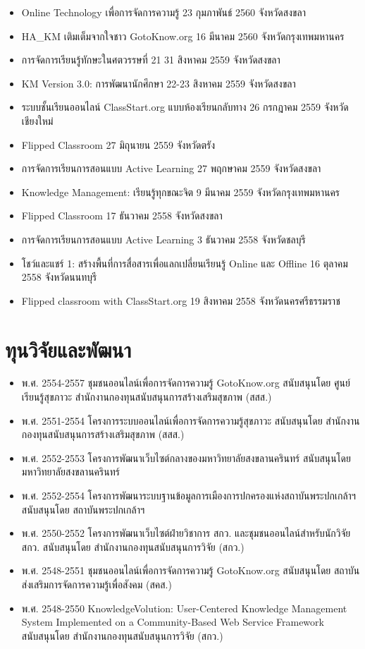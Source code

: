 \begin{appendices}
\begin{itemize}
	\item Online Technology เพื่อการจัดการความรู้ 23 กุมภาพันธ์ 2560  จังหวัดสงขลา
	\item HA\_KM เติมเต็มจากใจชาว GotoKnow.org 16 มีนาคม 2560 จังหวัดกรุงเทพมหานคร
	\item การจัดการเรียนรู้ทักษะในศตวรรษที่ 21 31 สิงหาคม 2559 จังหวัดสงขลา
	\item KM Version 3.0: การพัฒนานักศึกษา 22-23 สิงหาคม 2559  จังหวัดสงขลา
	\item ระบบชั้นเรียนออนไลน์ ClassStart.org แบบห้องเรียนกลับทาง 26 กรกฎาคม 2559  จังหวัดเชียงใหม่
	\item Flipped Classroom 27 มิถุนายน 2559  จังหวัดตรัง
	\item การจัดการเรียนการสอนแบบ Active Learning 27 พฤกษาคม 2559 จังหวัดสงขลา
	\item Knowledge Management: เรียนรู้ทุกขณะจิต 9 มีนาคม 2559  จังหวัดกรุงเทพมหานคร
	\item Flipped Classroom 17 ธันวาคม 2558 จังหวัดสงขลา
	\item การจัดการเรียนการสอนแบบ Active Learning 3 ธันวาคม 2558  จังหวัดชลบุรี
	\item โชว์และแชร์ 1: สร้างพื้นที่การสื่อสารเพื่อแลกเปลี่ยนเรียนรู้ Online และ Offline  16 ตุลาคม 2558 จังหวัดนนทบุรี
	\item Flipped classroom with ClassStart.org 19 สิงหาคม 2558  จังหวัดนครศรีธรรมราช
\end{itemize}

\section*{ทุนวิจัยและพัฒนา}

\begin{itemize}
	\item พ.ศ. 2554-2557 ชุมชนออนไลน์เพื่อการจัดการความรู้ GotoKnow.org สนับสนุนโดย ศูนย์เรียนรู้สุขภาวะ สำนักงานกองทุนสนับสนุนการสร้างเสริมสุขภาพ (สสส.)
	\item พ.ศ. 2551-2554 โครงการระบบออนไลน์เพื่อการจัดการความรู้สุขภาวะ สนับสนุนโดย สำนักงานกองทุนสนับสนุนการสร้างเสริมสุขภาพ (สสส.)
	\item พ.ศ. 2552-2553 โครงการพัฒนาเว็บไซต์กลางของมหาวิทยาลัยสงขลานครินทร์ สนับสนุนโดย มหาวิทยาลัยสงขลานครินทร์
	\item พ.ศ. 2552-2554 โครงการพัฒนาระบบฐานข้อมูลการเมืองการปกครองแห่งสถาบันพระปกเกล้าฯ สนับสนุนโดย สถาบันพระปกเกล้าฯ
	\item พ.ศ. 2550-2552 โครงการพัฒนาเว็บไซต์ฝ่ายวิชาการ สกว. และชุมชนออนไลน์สำหรับนักวิจัย สกว. สนับสนุนโดย สำนักงานกองทุนสนับสนุนการวิจัย (สกว.)
	\item พ.ศ. 2548-2551 ชุมชนออนไลน์เพื่อการจัดการความรู้ GotoKnow.org สนับสนุนโดย สถาบันส่งเสริมการจัดการความรู้เพื่อสังคม (สคส.)
	\item พ.ศ. 2548-2550 KnowledgeVolution: User-Centered Knowledge Management System Implemented on a Community-Based Web Service Framework สนับสนุนโดย สำนักงานกองทุนสนับสนุนการวิจัย (สกว.)
\end{itemize}


\end{appendices}
